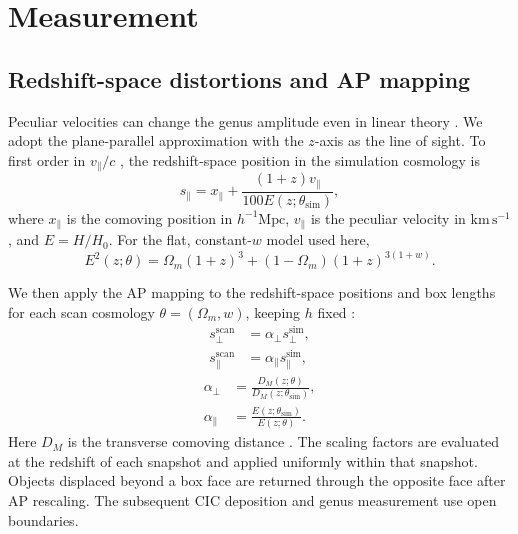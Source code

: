 \section{Measurement}\label{sec:measurement}
\subsection{Redshift-space distortions and AP mapping}
Peculiar velocities can change the genus amplitude even in linear theory \citep{Matsubara1996IsodensityRedshift}. We adopt the plane-parallel approximation with the $z$-axis as the line of sight. To first order in $v_\parallel/c$ \citep{DavisScrimgeour2014Peculiar}, the redshift-space position in the simulation cosmology is
\begin{equation}
s_\parallel=x_\parallel+\frac{(1+z)v_\parallel}{100E(z;\theta_{\mathrm{sim}})},
\end{equation}
where $x_\parallel$ is the comoving position in $h^{-1}\mathrm{Mpc}$, $v_\parallel$ is the peculiar velocity in $\mathrm{km\,s^{-1}}$, and $E=H/H_0$. For the flat, constant-$w$ model used here,
\begin{equation}
E^2(z;\theta)=\Omega_m(1+z)^3+(1-\Omega_m)(1+z)^{3(1+w)}.
\end{equation}

We then apply the AP mapping to the redshift-space positions and box lengths for each scan cosmology $\theta=(\Omega_m,w)$, keeping $h$ fixed \citep{Zunckel2011TopologyDE}:
\begin{equation}
\begin{aligned}
s_\perp^{\mathrm{scan}}&=\alpha_\perp s_\perp^{\mathrm{sim}},\\
s_\parallel^{\mathrm{scan}}&=\alpha_\parallel s_\parallel^{\mathrm{sim}},
\end{aligned}
\end{equation}
\begin{equation}
\begin{aligned}
\alpha_\perp&=\frac{D_M(z;\theta)}{D_M(z;\theta_{\mathrm{sim}})},\\
\alpha_\parallel&=\frac{E(z;\theta_{\mathrm{sim}})}{E(z;\theta)}.
\end{aligned}
\end{equation}
Here $D_M$ is the transverse comoving distance \citep{Hogg1999Distances}. The scaling factors are evaluated at the redshift of each snapshot and applied uniformly within that snapshot. Objects displaced beyond a box face are returned through the opposite face after AP rescaling. The subsequent CIC deposition and genus measurement use open boundaries.

